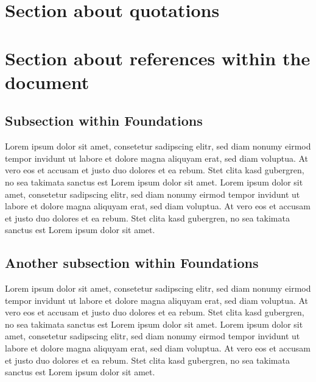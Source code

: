 \documentclass[a4paper]{article}
\begin{document}
\section{Section about quotations} %
\label{sec:section_about_quotations}


\section{Section about references within the document} %
\label{sec:section_about_references_within_the_document}





\subsection{Subsection within Foundations} %
\label{sub:subsection_within_foundations}
Lorem ipsum dolor sit amet, consetetur sadipscing elitr, sed diam nonumy eirmod tempor invidunt ut labore et dolore magna aliquyam erat, sed diam voluptua. At vero eos et accusam et justo duo dolores et ea rebum. Stet clita kasd gubergren, no sea takimata sanctus est Lorem ipsum dolor sit amet. Lorem ipsum dolor sit amet, consetetur sadipscing elitr, sed diam nonumy eirmod tempor invidunt ut labore et dolore magna aliquyam erat, sed diam voluptua. At vero eos et accusam et justo duo dolores et ea rebum. Stet clita kasd gubergren, no sea takimata sanctus est Lorem ipsum dolor sit amet.

\subsection{Another subsection within Foundations} %
\label{sub:another_subsection_within_foundations}
Lorem ipsum dolor sit amet, consetetur sadipscing elitr, sed diam nonumy eirmod tempor invidunt ut labore et dolore magna aliquyam erat, sed diam voluptua. At vero eos et accusam et justo duo dolores et ea rebum. Stet clita kasd gubergren, no sea takimata sanctus est Lorem ipsum dolor sit amet. Lorem ipsum dolor sit amet, consetetur sadipscing elitr, sed diam nonumy eirmod tempor invidunt ut labore et dolore magna aliquyam erat, sed diam voluptua. At vero eos et accusam et justo duo dolores et ea rebum. Stet clita kasd gubergren, no sea takimata sanctus est Lorem ipsum dolor sit amet.
\end{document}
